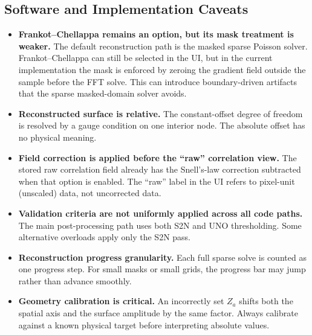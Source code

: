 \documentclass[11pt]{article}
\begin{document}
\subsection{Software and Implementation Caveats}

\begin{itemize}

  \item \textbf{Frankot--Chellappa remains an option, but its mask treatment
        is weaker.}
        The default reconstruction path is the masked sparse Poisson solver.
        Frankot--Chellappa can still be selected in the UI, but in the
        current implementation the mask is enforced by zeroing the gradient
        field outside the sample before the FFT solve. This can introduce
        boundary-driven artifacts that the sparse masked-domain solver avoids.

  \item \textbf{Reconstructed surface is relative.}
        The constant-offset degree of freedom is resolved by a gauge
        condition on one interior node. The absolute offset has no
        physical meaning.

  \item \textbf{Field correction is applied before the ``raw'' correlation
        view.}
        The stored raw correlation field already has the Snell's-law
        correction subtracted when that option is enabled. The ``raw''
        label in the UI refers to pixel-unit (unscaled) data, not
        uncorrected data.

  \item \textbf{Validation criteria are not uniformly applied across all
        code paths.}
        The main post-processing path uses both S2N and UNO thresholding.
        Some alternative overloads apply only the S2N pass.

  \item \textbf{Reconstruction progress granularity.}
        Each full sparse solve is counted as one progress step. For small
        masks or small grids, the progress bar may jump rather than
        advance smoothly.

  \item \textbf{Geometry calibration is critical.}
        An incorrectly set $Z_a$ shifts both the spatial axis and the
        surface amplitude by the same factor. Always calibrate against a
        known physical target before interpreting absolute values.

\end{itemize}
\end{document}
